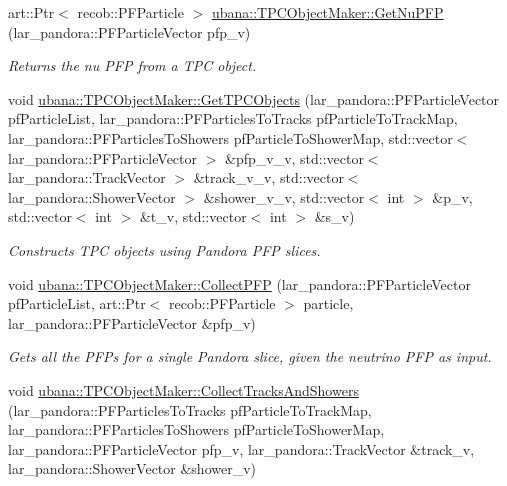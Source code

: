 \begin{DoxyCompactItemize}
\item 
art\-::\-Ptr$<$ recob\-::\-P\-F\-Particle $>$ \hyperlink{group__UBXSec_ga6a47470b5f5690a3626e14bc9f6f360c}{ubana\-::\-T\-P\-C\-Object\-Maker\-::\-Get\-Nu\-P\-F\-P} (lar\-\_\-pandora\-::\-P\-F\-Particle\-Vector pfp\-\_\-v)
\begin{DoxyCompactList}\small\item\em \-Returns the nu \-P\-F\-P from a \-T\-P\-C object. \end{DoxyCompactList}\item 
void \hyperlink{group__UBXSec_gad1aa79fd927be4bebd74bd6537144542}{ubana\-::\-T\-P\-C\-Object\-Maker\-::\-Get\-T\-P\-C\-Objects} (lar\-\_\-pandora\-::\-P\-F\-Particle\-Vector pf\-Particle\-List, lar\-\_\-pandora\-::\-P\-F\-Particles\-To\-Tracks pf\-Particle\-To\-Track\-Map, lar\-\_\-pandora\-::\-P\-F\-Particles\-To\-Showers pf\-Particle\-To\-Shower\-Map, std\-::vector$<$ lar\-\_\-pandora\-::\-P\-F\-Particle\-Vector $>$ \&pfp\-\_\-v\-\_\-v, std\-::vector$<$ lar\-\_\-pandora\-::\-Track\-Vector $>$ \&track\-\_\-v\-\_\-v, std\-::vector$<$ lar\-\_\-pandora\-::\-Shower\-Vector $>$ \&shower\-\_\-v\-\_\-v, std\-::vector$<$ int $>$ \&p\-\_\-v, std\-::vector$<$ int $>$ \&t\-\_\-v, std\-::vector$<$ int $>$ \&s\-\_\-v)
\begin{DoxyCompactList}\small\item\em \-Constructs \-T\-P\-C objects using \-Pandora \-P\-F\-P slices. \end{DoxyCompactList}\item 
void \hyperlink{group__UBXSec_ga9572bb5f180624d28ed9055591d633eb}{ubana\-::\-T\-P\-C\-Object\-Maker\-::\-Collect\-P\-F\-P} (lar\-\_\-pandora\-::\-P\-F\-Particle\-Vector pf\-Particle\-List, art\-::\-Ptr$<$ recob\-::\-P\-F\-Particle $>$ particle, lar\-\_\-pandora\-::\-P\-F\-Particle\-Vector \&pfp\-\_\-v)
\begin{DoxyCompactList}\small\item\em \-Gets all the \-P\-F\-Ps for a single \-Pandora slice, given the neutrino \-P\-F\-P as input. \end{DoxyCompactList}\item 
void \hyperlink{group__UBXSec_ga4742f34e12ae8d756648f606123fe810}{ubana\-::\-T\-P\-C\-Object\-Maker\-::\-Collect\-Tracks\-And\-Showers} (lar\-\_\-pandora\-::\-P\-F\-Particles\-To\-Tracks pf\-Particle\-To\-Track\-Map, lar\-\_\-pandora\-::\-P\-F\-Particles\-To\-Showers pf\-Particle\-To\-Shower\-Map, lar\-\_\-pandora\-::\-P\-F\-Particle\-Vector pfp\-\_\-v, lar\-\_\-pandora\-::\-Track\-Vector \&track\-\_\-v, lar\-\_\-pandora\-::\-Shower\-Vector \&shower\-\_\-v)

\end{DoxyCompactItemize}
